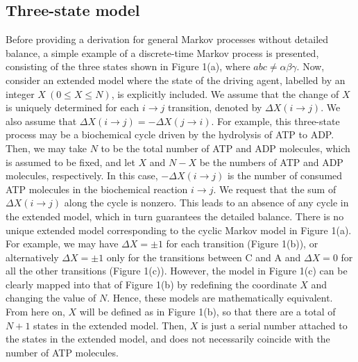 \documentclass[aps,pre,amsmath,amssymb,floatfix,preprint,nofootinbib]{revtex4}
\begin{document}
\subsection{Three-state model}
 Before providing a derivation for general Markov processes without detailed balance, a simple example of a discrete-time Markov process is presented, consisting of the three states shown in Figure 1(a), where $a b c \ne \alpha \beta \gamma$. Now, consider an extended model where the state of the driving agent, labelled by an integer $X\ (0 \le X \le N)$, is explicitly included. We assume that the change of $X$ is uniquely determined for each $i \to j$ transition, denoted by $\Delta X (i \to j)$. We also assume that $\Delta X (i \to j) = -\Delta X (j \to i)$. For example, this three-state process may be a biochemical cycle driven by the hydrolysis of ATP to ADP. Then, we may take $N$ to be the total number of ATP and ADP molecules, which is assumed to be fixed, and let $X$ and $N-X$ be the numbers of ATP and ADP molecules, respectively. In this case, $-\Delta X (i \to j)$ is the number of consumed ATP molecules in the biochemical reaction $i \to j$. We request that the sum of $\Delta X(i \to j)$ along the cycle is nonzero. This leads to an absence of any cycle in the extended model, which in turn guarantees the detailed balance. There is no unique extended model corresponding to the cyclic Markov model in Figure 1(a). For example, we may have $\Delta X = \pm 1$ for each transition (Figure 1(b)), or alternatively  $\Delta X = \pm 1$  only for the transitions between C and A and $\Delta X = 0$ for all the other transitions (Figure 1(c)). However, the model in Figure 1(c) can be clearly mapped into that of Figure 1(b) by redefining the coordinate $X$ and changing the value of $N$. Hence, these models are mathematically equivalent. From here on, $X$ will be defined as in Figure 1(b), so that there are a total of $N+1$ states in the extended model. Then, $X$ is just a serial number attached to the states in the extended model, and does not necessarily coincide with the number of ATP molecules.
\end{document}
